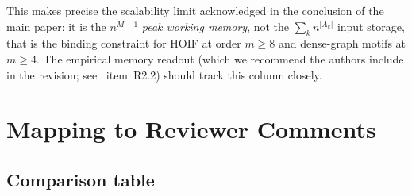 \documentclass[11pt]{article}
\theoremstyle{plain}
\theoremstyle{definition}
\begin{document}
This makes precise the scalability limit acknowledged in the conclusion of
the main paper: it is the $n^{M+1}$ \emph{peak working memory}, not the
$\sum_k n^{|A_k|}$ input storage, that is the binding constraint for HOIF
at order $m\geq 8$ and dense-graph motifs at $m\geq 4$.  The empirical
memory readout (which we recommend the authors include in the revision;
see~ item~R2.2) should track this column closely.

\section{Mapping to Reviewer Comments}
\label{sec:reviewer}

\subsection{Comparison table}
\end{document}
